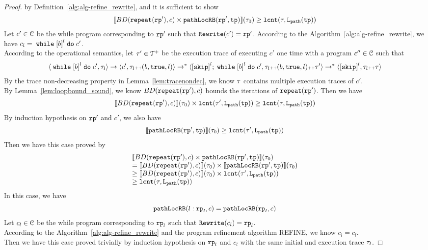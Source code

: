 \begin{proof}
by Definition~\ref{alg:alg-refine_rewrite}, and
it is sufficient to show
\[
  \llbracket  BD(\mathtt{repeat}(\mathtt{rp}'), c) \times \mathtt{pathLocRB}(\mathtt{rp}', \mathtt{tp}) \rrbracket (\mathtt{\tau}_0) \geq \mathtt{lcnt}(\mathtt{\tau}, \mathtt{L}_{\mathtt{path}}(\mathtt{tp})) 
\]
Let $c' \in \mathcal{C}$ be the while program corresponding to $\mathtt{rp}'$ such that $\mathtt{Rewrite}(c') = \mathtt{rp}'$.
According to the Algorithm~\ref{alg:alg-refine_rewrite}, we have $c_l = \ewhile \clabel{\bexpr}^{l} \edo c'$.
\\
According to the operational semantics, let $\mathtt{\tau}' \in \mathcal{T}^{+}$ be the execution trace of executing $c'$ one time with a program $c'' \in \mathcal{C}$ such that 
\[
  \config{\ewhile \clabel{\bexpr}^{l} \edo c', \trace_l} \to \config{c', \trace_l \tracecat (\bexpr, \etrue, l)} \to^* \config{\clabel{\eskip}^{l}; \ewhile \clabel{\bexpr}^{l} \edo c', \trace_l \tracecat (\bexpr, \etrue, l) \tracecat \trace'}
  \to^* \config{\clabel{\eskip}^{l}, \trace_l \tracecat \trace}
\]
By the trace non-decreasing property in Lemma~\ref{lem:tracenondec}, we know $\mathtt{\tau}$ contains multiple execution traces of $c'$.
\\
By Lemma~\ref{lem:loopbound_sound}, we know $BD(\mathtt{repeat}(\mathtt{rp}'), c)$ bounds the iterations of $\mathtt{repeat}(\mathtt{rp}')$. Then we have
\[
  \llbracket BD(\mathtt{repeat}(\mathtt{rp}'), c) \rrbracket(\mathtt{\tau}_0) \times \mathtt{lcnt}(\mathtt{\tau}', \mathtt{L}_{\mathtt{path}}(\mathtt{tp}))  
  \geq \mathtt{lcnt}(\mathtt{\tau}, \mathtt{L}_{\mathtt{path}}(\mathtt{tp})) 
\]
By induction hypothesis on $\mathtt{rp}'$ and $c'$, we also have
\[
  \llbracket \mathtt{pathLocRB}(\mathtt{rp}', \mathtt{tp}) \rrbracket(\mathtt{\tau}_0) \geq \mathtt{lcnt}(\mathtt{\tau}',  \mathtt{L}_{\mathtt{path}}(\mathtt{tp})) 
\]
Then we have this case proved by
\[
  \begin{array}{l}
  \llbracket BD(\mathtt{repeat}(\mathtt{rp}'), c) \times \mathtt{pathLocRB}(\mathtt{rp}', \mathtt{tp}) \rrbracket(\mathtt{\tau}_0) 
  \\
  =
  \llbracket BD(\mathtt{repeat}(\mathtt{rp}'), c) \rrbracket(\mathtt{\tau}_0) \times \llbracket \mathtt{pathLocRB}(\mathtt{rp}', \mathtt{tp}) \rrbracket(\mathtt{\tau}_0) 
  \\
  \geq \llbracket BD(\mathtt{repeat}(\mathtt{rp}'), c) \rrbracket(\mathtt{\tau}_0) \times \mathtt{lcnt}(\mathtt{\tau}',  \mathtt{L}_{\mathtt{path}}(\mathtt{tp}))  
  \\
  \geq \mathtt{lcnt}(\mathtt{\tau}, \mathtt{L}_{\mathtt{path}}(\mathtt{tp})) 
  \end{array}
  \]
  In this case, we have
  \[
    \mathtt{pathLocRB}(l: \mathtt{rp}_l, c) = \mathtt{pathLocRB}(\mathtt{rp}_l, c)
  \]
  Let $c_l \in \mathcal{C}$ be the while program corresponding to $\mathtt{rp}_l$ such that $\mathtt{Rewrite}(c_l) = \mathtt{rp}_l$.
  \\
  According to the Algorithm~\ref{alg:alg-refine_rewrite} and the program refinement algorithm REFINE, we know
  $c_l = c_l$.
  \\
  Then we have this case proved trivially by induction hypothesis on $\mathtt{rp}_l$ and $c_l$ with the same initial and execution trace $\mathtt{\tau}_l$.


\end{proof}
